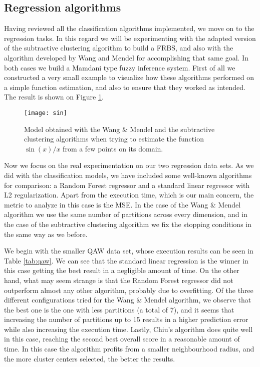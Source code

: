 \subsection{Regression algorithms}

Having reviewed all the classification algorithms implemented, we move on to the regression tasks. In this regard we will be experimenting with the adapted version of the subtractive clustering algorithm to build a FRBS, and also with the algorithm developed by Wang and Mendel for accomplishing that same goal. In both cases we build a Mamdani type fuzzy inference system. First of all we constructed a very small example to visualize how these algorithms performed on a simple function estimation, and also to ensure that they worked as intended. The result is shown on Figure \ref{fig:sin}.

\begin{figure}[h!]
\centering
\texttt{[image: sin]}
\caption{Model obtained with the Wang \& Mendel and the subtractive clustering algorithms when trying to estimate the function $\sin(x)/x$ from a few points on its domain.}
\label{fig:sin}
\end{figure}

Now we focus on the real experimentation on our two regression data sets. As we did with the classification models, we have included some well-known algorithms for comparison: a Random Forest regressor and a standard linear regressor with L2 regularization. Apart from the execution time, which is our main concern, the metric to analyze in this case is the MSE. In the case of the Wang \& Mendel algorithm we use the same number of partitions across every dimension, and in the case of the subtractive clustering algorithm we fix the stopping conditions in the same way as we before.

We begin with the smaller QAW data set, whose execution results can be seen in Table \ref{tab:qaw}. We can see that the standard linear regression is the winner in this case getting the best result in a negligible amount of time. On the other hand, what may seem strange is that the Random Forest regressor did not outperform almost any other algorithm, probably due to overfitting. Of the three different configurations tried for the Wang \& Mendel algorithm, we observe that the best one is the one with less partitions (a total of 7), and it seems that increasing the number of partitions up to 15 results in a higher prediction error while also increasing the execution time. Lastly, Chiu's algorithm does quite well in this case, reaching the second best overall score in a reasonable amount of time. In this case the algorithm profits from a smaller neighbourhood radius, and the more cluster centers selected, the better the results.

